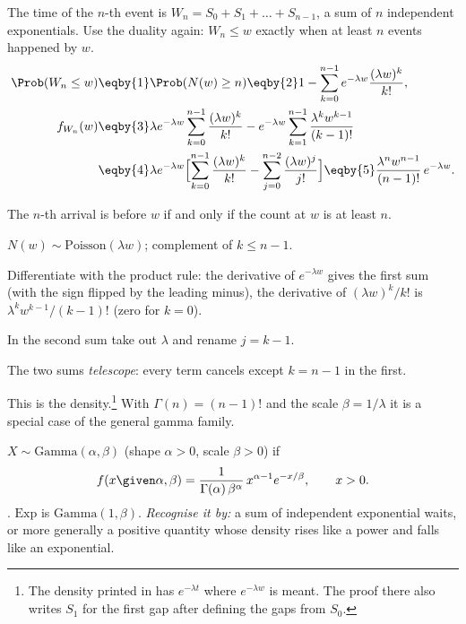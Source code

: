 The time of the $n$-th event is $W_n=S_0+S_1+\dots+S_{n-1}$, a sum of $n$ independent exponentials. Use the duality again: $W_n\le w$ exactly when at least $n$ events happened by $w$.
\begin{align}
  \Prob(W_n\le w) &\eqby{1} \Prob(N(w)\ge n) \eqby{2} 1-\sum_{k=0}^{n-1}e^{-\lambda w}\frac{(\lambda w)^k}{k!}, \nonumber\\
  f_{W_n}(w) &\eqby{3} \lambda e^{-\lambda w}\sum_{k=0}^{n-1}\frac{(\lambda w)^k}{k!}-e^{-\lambda w}\sum_{k=1}^{n-1}\frac{\lambda^kw^{k-1}}{(k-1)!} \nonumber\\
  &\eqby{4} \lambda e^{-\lambda w}\Bigl[\sum_{k=0}^{n-1}\frac{(\lambda w)^k}{k!}-\sum_{j=0}^{n-2}\frac{(\lambda w)^j}{j!}\Bigr]
   \eqby{5} \frac{\lambda^n w^{n-1}}{(n-1)!}\,e^{-\lambda w}. \label{2a:eq:erlang}
\end{align}
\begin{explain}
  \item The $n$-th arrival is before $w$ if and only if the count at $w$ is at least $n$.
  \item $N(w)\sim\mathrm{Poisson}(\lambda w)$; complement of $k\le n-1$.
  \item Differentiate with the product rule: the derivative of $e^{-\lambda w}$ gives the first sum (with the sign flipped by the leading minus), the derivative of $(\lambda w)^k/k!$ is $\lambda^kw^{k-1}/(k-1)!$ (zero for $k=0$).
  \item In the second sum take out $\lambda$ and rename $j=k-1$.
  \item The two sums \emph{telescope}: every term cancels except $k=n-1$ in the first.
\end{explain}
This is the  density.\footnote{The density printed in  has $e^{-\lambda t}$ where $e^{-\lambda w}$ is meant. The proof there also writes $S_1$ for the first gap after defining the gaps from $S_0$.} With $\Gamma(n)=(n-1)!$ and the scale $\beta=1/\lambda$ it is a special case of the general gamma family.

\begin{workdef}
$X\sim\mathrm{Gamma}(\alpha,\beta)$ (shape $\alpha>0$, scale $\beta>0$) if
\begin{equation}
  f(x\given\alpha,\beta)=\frac{1}{\Gamma(\alpha)\,\beta^\alpha}\,x^{\alpha-1}e^{-x/\beta},\qquad x>0. \label{2a:eq:gamma}
\end{equation}
. $\mathrm{Exp}$ is $\mathrm{Gamma}(1,\beta)$.
\emph{Recognise it by:} a sum of independent exponential waits, or more generally a positive quantity whose density rises like a power and falls like an exponential.
\end{workdef}

